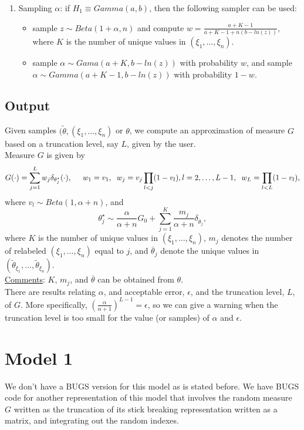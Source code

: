 \documentclass[12pt]{article}
\begin{document}
\begin{enumerate}
\item Sampling $\alpha$: if $H_1\equiv Gamma(a,b)$, then the following sampler can be used:
\begin{itemize}
\item sample $z\sim Beta(1+\alpha, n)$ and compute $w=\frac{a+K-1}{a+K-1+n(b-ln(z))},$ where $K$ is the number of unique values in $(\xi_1 ,\ldots, \xi_n)$.
\item sample $\alpha\sim Gama(a+K, b-ln(z))$ with probability $w$, and sample $\alpha\sim Gamma(a+K-1, b-ln(z))$ with probability $1-w$.
\end{itemize}
\end{enumerate}

\subsection{Output}
Given samples  $(\tilde{\theta}, (\xi_1, \ldots, \xi_n)$  or $\theta$,  we compute an approximation of measure $G$ based on a truncation level, say $L$, given by the user. \\
Measure $G$ is given by 
$$G(\cdot)=\sum_{j=1}^Lw_j\delta_{\theta^{\star}_j}(\cdot), \hspace{0.5cm} w_1=v_1, \hspace{0.2cm}w_j=v_j\prod_{l<j}(1-v_l), l=2, \ldots, L-1, \hspace{0.2cm}w_L=\prod_{l<L}(1-v_l),$$
where $v_l\sim Beta(1, \alpha+n)$, and $$\theta^{\star}_j\sim \frac{\alpha}{\alpha+n}G_0 + \sum_{j=1}^K\frac{m_j}{\alpha+n}\delta_{\overline{\theta}_j},$$
where $K$ is the number of unique values in $(\xi_1 ,\ldots, \xi_n)$, $m_j$ denotes the number of relabeled $(\xi_1 ,\ldots, \xi_n)$ equal to $j$, and $\overline{\theta}_j$ denote the  unique values in $(\tilde{\theta}_{\xi_1}, \ldots, \tilde{\theta}_{\xi_n})$.\\

\underline{Comments}: $K$, $m_j$, and $\overline{\theta}$ can be obtained from $\theta$.\\
There are results relating $\alpha$, and acceptable error, $\epsilon$, and  the truncation level, $L$, of $G$. More specifically,  $\left(\frac{\alpha}{\alpha+1}\right)^{L-1}=\epsilon$, so we can give a warning when the truncation level is too small for the value (or samples) of $\alpha$ and $\epsilon$.


\section{Model 1}
We don't have a BUGS version for this model as is stated before. We have  BUGS code for another representation of this model that involves the random measure $G$ written as the truncation of its stick breaking representation  written as a matrix,  and integrating out the random indexes. 
\end{document}
